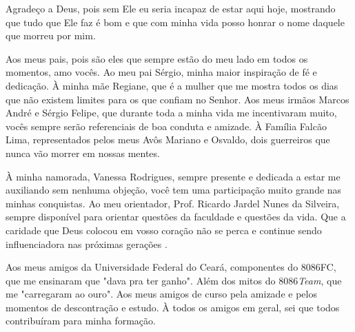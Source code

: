 \begin{agradecimentos}
	Agradeço  a Deus, pois sem Ele eu seria incapaz de estar aqui hoje,
	mostrando que  tudo que Ele faz é bom e que com minha vida posso honrar o nome daquele que morreu por mim.

	Aos meus pais, pois são eles que sempre estão do meu lado em todos os momentos, amo vocês. Ao meu pai Sérgio, minha maior inspiração de fé e dedicação. À minha mãe Regiane, que é a mulher que me mostra todos os dias que não existem limites para os que confiam no Senhor. Aos meus irmãos Marcos André e Sérgio Felipe, que durante toda a minha vida me incentivaram muito, vocês sempre serão  referenciais de boa conduta e amizade. À Família Falcão Lima, representados pelos meus Avôs Mariano e Osvaldo, dois guerreiros que nunca vão morrer em nossas mentes.
	 	
	À minha namorada, Vanessa Rodrigues, sempre presente e dedicada a estar me  auxiliando sem nenhuma objeção, você tem uma participação muito grande nas minhas conquistas.  
	Ao meu orientador, Prof. Ricardo Jardel Nunes da Silveira, sempre disponível para orientar questões da faculdade e questões da vida. Que a caridade que Deus colocou em vosso coração não se perca e continue sendo influenciadora nas próximas gerações .
	
	
	Aos meus amigos da Universidade Federal do Ceará, componentes do 8086FC, que me ensinaram que "dava pra ter ganho". Além dos mitos do 8086\textit{Team}, que me "carregaram ao ouro". Aos meus amigos de curso pela amizade e pelos momentos de descontração e estudo. À todos os amigos em geral, sei que todos contribuíram para minha formação.
	

\end{agradecimentos}
